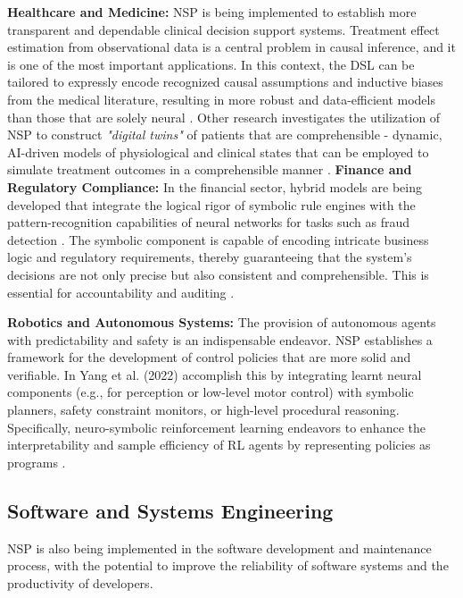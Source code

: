\documentclass[12pt, a4paper]{report}
\begin{document}
\textbf{Healthcare and Medicine:} NSP is being implemented to establish more transparent and dependable clinical decision support systems. Treatment effect estimation from observational data is a central problem in causal inference, and it is one of the most important applications. In this context, the DSL can be tailored to expressly encode recognized causal assumptions and inductive biases from the medical literature, resulting in more robust and data-efficient models than those that are solely neural \citep{lee2022neuro-causal}. Other research investigates the utilization of NSP to construct \textit{"digital twins"} of patients that are comprehensible - dynamic, AI-driven models of physiological and clinical states that can be employed to simulate treatment outcomes in a comprehensible manner \citep{xia2022automated}.
\textbf{Finance and Regulatory Compliance:} In the financial sector, hybrid models are being developed that integrate the logical rigor of symbolic rule engines with the pattern-recognition capabilities of neural networks for tasks such as fraud detection \citep{manna1980deductive}. The symbolic component is capable of encoding intricate business logic and regulatory requirements, thereby guaranteeing that the system's decisions are not only precise but also consistent and comprehensible. This is essential for accountability and auditing \citep{chaudhuri2021neurosymbolic}.

\textbf{Robotics and Autonomous Systems:} The provision of autonomous agents with predictability and safety is an indispensable endeavor. NSP establishes a framework for the development of control policies that are more solid and verifiable. In Yang et al. (2022) \citep{yang2022differentiable} accomplish this by integrating learnt neural components (e.g., for perception or low-level motor control) with symbolic planners, safety constraint monitors, or high-level procedural reasoning. Specifically, neuro-symbolic reinforcement learning endeavors to enhance the interpretability and sample efficiency of RL agents by representing policies as programs \citep{verma2018programmatically}.

\subsection{Software and Systems Engineering}
NSP is also being implemented in the software development and maintenance process, with the potential to improve the reliability of software systems and the productivity of developers.
\end{document}

